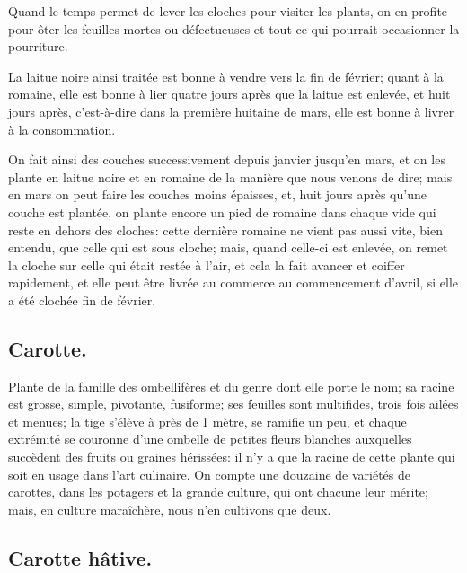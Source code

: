 \documentclass[10pt,a4paper]{book}
\begin{document}
Quand le temps permet de lever les cloches pour visiter les plants, on en profite pour ôter les feuilles mortes ou défectueuses et tout ce qui pourrait occasionner la pourriture.

La laitue noire ainsi traitée est bonne à vendre vers la fin de février; quant à la romaine, elle est bonne à lier quatre jours après que la laitue est enlevée, et huit jours après, c'est-à-dire dans la première huitaine de mars, elle est bonne à livrer à la consommation.

On fait ainsi des couches successivement depuis janvier jusqu'en mars, et on les plante en laitue noire et en romaine de la manière que nous venons de dire; mais en mars on peut faire les couches moins épaisses, et, huit jours après qu'une couche est plantée, on plante encore un pied de romaine dans chaque vide qui reste en dehors des cloches: cette dernière romaine ne vient pas aussi vite, bien entendu, que celle qui est sous cloche; mais, quand celle-ci est enlevée, on remet la cloche sur celle qui était restée à l'air, et cela la fait avancer et coiffer rapidement, et elle peut être livrée au commerce au commencement d'avril, si elle a été clochée fin de février.

\subsection{Carotte.}

Plante de la famille des ombellifères et du genre dont elle porte le nom; sa racine est grosse, simple, pivotante, fusiforme; ses feuilles sont multifides, trois fois ailées et menues; la tige s'élève à près de 1 mètre, se ramifie un peu, et chaque extrémité se couronne d'une ombelle de petites fleurs blanches auxquelles succèdent des fruits ou graines hérissées: il n'y a que la racine de cette plante qui soit en usage dans l'art culinaire. On compte une douzaine de variétés de carottes, dans les potagers et la grande culture, qui ont chacune leur mérite; mais, en culture maraîchère, nous n'en cultivons que deux.

\subsection{Carotte hâtive.}
\end{document}
